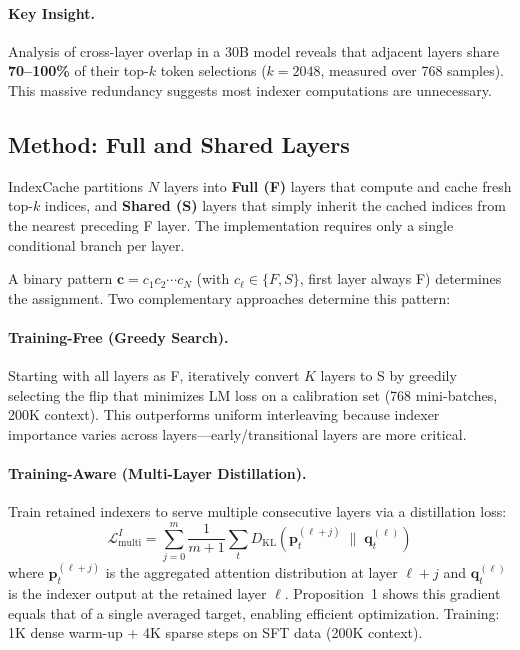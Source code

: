 \documentclass[11pt]{article}
\begin{document}
\paragraph{Key Insight.} Analysis of cross-layer overlap in a 30B model reveals that adjacent layers share \textbf{70--100\%} of their top-$k$ token selections ($k{=}2048$, measured over 768 samples). This massive redundancy suggests most indexer computations are unnecessary.

\subsection{Method: Full and Shared Layers}

IndexCache partitions $N$ layers into \textbf{Full (F)} layers that compute and cache fresh top-$k$ indices, and \textbf{Shared (S)} layers that simply inherit the cached indices from the nearest preceding F layer. The implementation requires only a single conditional branch per layer.

A binary pattern $\mathbf{c} = c_1 c_2 \cdots c_N$ (with $c_\ell \in \{F, S\}$, first layer always F) determines the assignment. Two complementary approaches determine this pattern:

\paragraph{Training-Free (Greedy Search).} Starting with all layers as F, iteratively convert $K$ layers to S by greedily selecting the flip that minimizes LM loss on a calibration set (768 mini-batches, 200K context). This outperforms uniform interleaving because indexer importance varies across layers---early/transitional layers are more critical.

\paragraph{Training-Aware (Multi-Layer Distillation).} Train retained indexers to serve multiple consecutive layers via a distillation loss:
\begin{equation}
    \mathcal{L}^I_{\text{multi}} = \sum_{j=0}^{m} \frac{1}{m{+}1} \sum_t D_{\text{KL}}\!\left(\mathbf{p}_t^{(\ell+j)} \;\|\; \mathbf{q}_t^{(\ell)}\right)
\end{equation}
where $\mathbf{p}_t^{(\ell+j)}$ is the aggregated attention distribution at layer $\ell{+}j$ and $\mathbf{q}_t^{(\ell)}$ is the indexer output at the retained layer $\ell$. Proposition~1 shows this gradient equals that of a single averaged target, enabling efficient optimization. Training: 1K dense warm-up + 4K sparse steps on SFT data (200K context).
\end{document}
